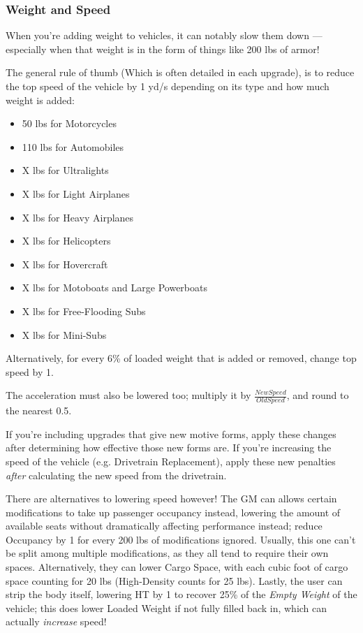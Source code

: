 \begin{multicols*}{2}
	\subsubsection{Weight and Speed}\label{weight_and_speed}
	
	When you're adding weight to vehicles, it can notably slow them down — especially when that weight is in the form of things like 200 lbs of armor! 
	
	The general rule of thumb (Which is often detailed in each upgrade), is to reduce the top speed of the vehicle by 1 yd/s depending on its type and how much weight is added:
	
	\begin{itemize}
		\itemsep 0pt
		\item 50 lbs for Motorcycles
		\item 110 lbs for Automobiles
		\item X lbs for Ultralights
		\item X lbs for Light Airplanes
		\item X lbs for Heavy Airplanes
		\item X lbs for Helicopters
		\item X lbs for Hovercraft
		\item X lbs for Motoboats and Large Powerboats
		\item X lbs for Free-Flooding Subs
		\item X lbs for Mini-Subs
	\end{itemize}

	Alternatively, for every 6\% of loaded weight that is added or removed, change top speed by 1.
	
	The acceleration must also be lowered too; multiply it by $\frac{New Speed}{Old Speed}$, and round to the nearest 0.5. 
	
	If you're including upgrades that give new motive forms, apply these changes after determining how effective those new forms are. If you're increasing the speed of the vehicle (e.g. Drivetrain Replacement), apply these new penalties \textit{after} calculating the new speed from the drivetrain.
	
	There are alternatives to lowering speed however! The GM can allows certain modifications to take up passenger occupancy instead, lowering the amount of available seats without dramatically affecting performance instead; reduce Occupancy by 1 for every 200 lbs of modifications ignored. Usually, this one can't be split among multiple modifications, as they all tend to require their own spaces. Alternatively, they can lower Cargo Space, with each cubic foot of cargo space counting for 20 lbs (High-Density counts for 25 lbs). Lastly, the user can strip the body itself, lowering HT by 1 to recover 25\% of the \textit{Empty Weight} of the vehicle; this does lower Loaded Weight if not fully filled back in, which can actually \textit{increase} speed!
			

\end{multicols*}
